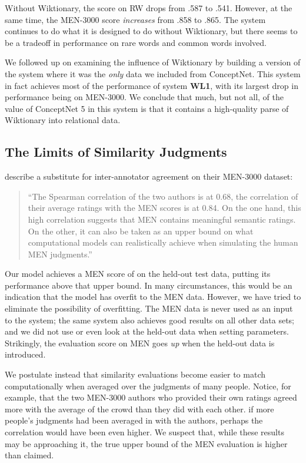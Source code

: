 \documentclass[letterpaper]{article}
\begin{document}
Without Wiktionary, the score on RW drops from .587 to .541. However, at the
same time, the MEN-3000 score {\em increases} from .858 to .865. The system
continues to do what it is designed to do without Wiktionary, but there seems to
be a tradeoff in performance on rare words and common words involved.

We followed up on examining the influence of Wiktionary by building a version of
the system where it was the {\em only} data we included from ConceptNet. This
system in fact achieves most of the performance of system {\bf WL1}, with its
largest drop in performance being on MEN-3000. We conclude that much, but not
all, of the value of ConceptNet 5 in this system is that it contains a
high-quality parse of Wiktionary into relational data.

\subsection{The Limits of Similarity Judgments}

 describe a substitute for inter-annotator agreement on
their MEN-3000 dataset:

\begin{quote}
``The Spearman correlation of the two authors is at 0.68, the correlation of their
average ratings with the MEN scores is at 0.84. On the one hand, this high
correlation suggests that MEN contains meaningful semantic ratings. On the
other, it can also be taken as an upper bound on what computational models can
realistically achieve when simulating the human MEN judgments.''
\end{quote}

Our model achieves a MEN score of \scoreMEN{} on the
held-out test data, putting its performance above that upper bound. In many
circumstances, this would be an indication that the model has overfit to the
MEN data. However, we have tried to eliminate the possibility of overfitting.
The MEN data is never used as an input to the system; the same system also
achieves good results on all other data sets; and we did not use or even
look at the held-out data when setting parameters. Strikingly, the evaluation
score on MEN goes {\em up} when the held-out data is introduced.

We postulate instead that similarity evaluations become easier to match
computationally when averaged over the judgments of many people. Notice, for
example, that the two MEN-3000 authors who provided their own ratings
agreed more with the average of the crowd than they did with each other.
if more people's judgments had been averaged in with the authors, perhaps the
correlation would have been even higher. We suspect that, while these results
may be approaching it, the true upper bound of the MEN evaluation is higher than
claimed.
\end{document}
